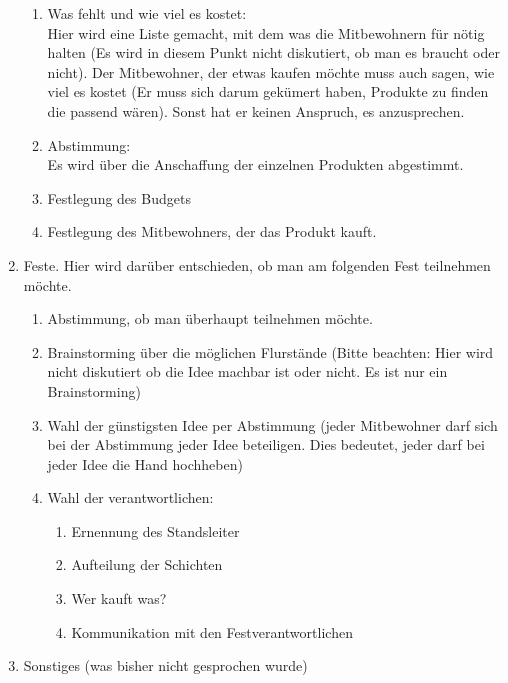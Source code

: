\documentclass[10pt,a4paper,final]{article}
\begin{document}
\begin{enumerate}
\begin{enumerate}
\item Was fehlt und wie viel es kostet:\\
Hier wird eine Liste gemacht, mit dem was die Mitbewohnern für nötig halten (Es wird in diesem Punkt nicht diskutiert, ob man es braucht oder nicht). Der Mitbewohner, der etwas kaufen möchte muss auch sagen, wie viel es kostet (Er muss sich darum gekümert haben, Produkte zu finden die passend wären). Sonst hat er keinen Anspruch, es anzusprechen.
\item Abstimmung:\\
Es wird über die Anschaffung der einzelnen Produkten abgestimmt.
\item Festlegung des Budgets
\item Festlegung des Mitbewohners, der das Produkt kauft.

\end{enumerate}





\item Feste. Hier wird darüber entschieden, ob man am folgenden Fest teilnehmen möchte.

\begin{enumerate}
\item Abstimmung, ob man überhaupt teilnehmen möchte.
\item Brainstorming über die möglichen Flurstände (Bitte beachten: Hier wird nicht diskutiert ob die Idee machbar ist oder nicht. Es ist nur ein Brainstorming)
\item Wahl der günstigsten Idee per Abstimmung (jeder Mitbewohner darf sich bei der Abstimmung jeder Idee beteiligen. Dies bedeutet, jeder darf bei jeder Idee die Hand hochheben)
\item Wahl der verantwortlichen: 

\begin{enumerate}
\item Ernennung des Standsleiter
\item Aufteilung der Schichten
\item Wer kauft was?
\item Kommunikation mit den Festverantwortlichen
\end{enumerate}

\end{enumerate}


\item Sonstiges (was bisher nicht gesprochen wurde)


\end{enumerate}
\end{document}
